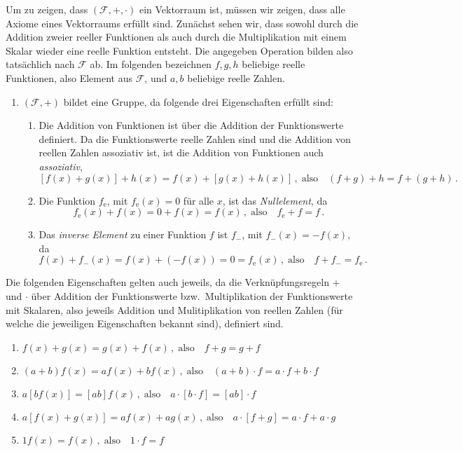 \documentclass[11pt]{scrartcl}
\begin{document}
\begin{solution}
  Um zu zeigen, dass $(\mathcal{F}, +, \cdot)$ ein Vektorraum ist, müssen wir zeigen, dass alle Axiome eines Vektorraums erfüllt sind.
  Zunächst sehen wir, dass sowohl durch die Addition zweier reeller Funktionen als auch durch die Multiplikation mit einem Skalar wieder eine reelle Funktion entsteht.
  Die angegeben Operation bilden also tatsächlich nach $\mathcal{F}$ ab.
  Im folgenden bezeichnen $f,g,h$ beliebige reelle Funktionen, also Element aus $\mathcal{F}$, und $a,b$ beliebige reelle Zahlen.

  \begin{enumerate}
  \item $(\mathcal{F},+)$ bildet eine Gruppe, da folgende drei Eigenschaften erfüllt sind:
    \begin{enumerate}
    \item Die Addition von Funktionen ist über die Addition der Funktionswerte definiert. Da die Funktionswerte reelle Zahlen sind und die Addition von reellen Zahlen assoziativ ist, ist die Addition von Funktionen auch \emph{assoziativ},
      \[
        [f(x)+g(x)]+h(x) = f(x)+[g(x)+h(x)] \,, \; \textrm{also} \quad (f+g)+h = f+(g+h) \,.
      \]
    \item Die Funktion $f_\mathrm{e}$, mit $f_\mathrm{e}(x)=0$ für alle $x$, ist das \emph{Nullelement}, da
      \[
        f_\mathrm{e}(x) + f(x) = 0 + f(x) = f(x) \,, \; \textrm{also} \quad f_\mathrm{e} + f = f \,.
      \]
    \item Das \emph{inverse Element} zu einer Funktion $f$ ist $f_-$, mit $f_-(x) = -f(x)$, da
      \[
        f(x) + f_-(x) = f(x) + (-f(x)) = 0 = f_\mathrm{e}(x) \,, \; \textrm{also} \quad f + f_- = f_\mathrm{e} \,.
      \]
    \end{enumerate}
  \end{enumerate}
  Die folgenden Eigenschaften gelten auch jeweils, da die Verknüpfungsregeln $+$ und $\cdot$ über Addition der Funktionswerte bzw.\ Multiplikation der Funktionswerte mit Skalaren, also jeweils Addition und Mulitiplikation von reellen Zahlen (für welche die jeweiligen Eigenschaften bekannt sind), definiert sind.
  \begin{enumerate}
    \item \( f(x) + g(x) = g(x) + f(x) \,, \; \textrm{also} \quad f + g = g + f \)
    \item \( (a + b) f(x)  = a f(x) + b f(x) \,, \; \textrm{also} \quad (a+b) \cdot f = a \cdot f + b \cdot f \)
    \item \( a [b f(x)] = [ab] f(x) \,, \; \textrm{also} \quad a \cdot [ b \cdot f ] = [ab] \cdot f \)
    \item \( a [f(x) + g(x)] = a f(x) + a g(x) \,, \; \textrm{also} \quad a \cdot [f + g] = a \cdot f + a \cdot g \)
    \item \( 1 f(x) = f(x) \,, \; \textrm{also} \quad 1 \cdot f = f \)
  \end{enumerate}
\end{solution}
\end{document}
